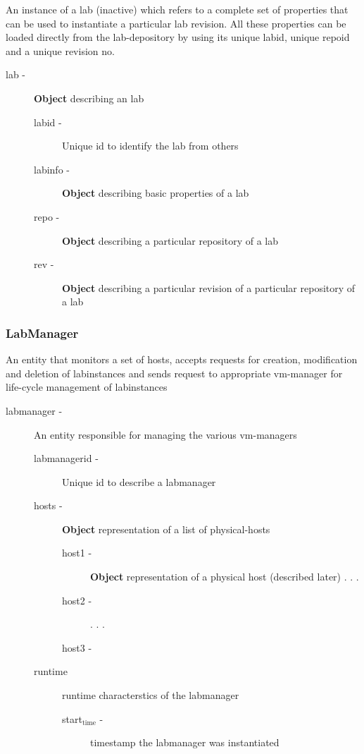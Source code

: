 \documentclass[11pt]{article}
\begin{document}
    An instance of a lab (inactive)  which refers to a complete set of
    properties that can be used to instantiate a particular lab
    revision. All these properties can be loaded directly from the
    lab-depository by using its unique labid, unique repoid and a
    unique revision no.

\begin{description}
\item [lab -]  \textbf{Object} describing an lab

\begin{description}
\item [labid -] Unique id to identify the lab from others
\item [labinfo -] \textbf{Object} describing basic properties of a lab
\item [repo -] \textbf{Object} describing a particular repository of a lab
\item [rev -] \textbf{Object} describing a particular revision of a particular
             repository of a lab
\end{description}

\end{description}
\subsubsection{LabManager}
\label{sec-1.3.3}


     An entity that monitors a set of hosts, accepts requests for
     creation, modification and deletion of labinstances and sends
     request to appropriate vm-manager for life-cycle management of
     labinstances

\begin{description}
\item [labmanager -] An entity responsible for managing the various vm-managers

\begin{description}
\item [labmanagerid -] Unique id to describe a labmanager
\item [hosts -] \textbf{Object} representation of a list of physical-hosts

\begin{description}
\item [host1 -] \textbf{Object} representation of a physical host (described later)
            .
            .
            .
\item [host2 -]
            .
            .
            .
\item [host3 -]
\end{description}

\item [runtime] runtime characterstics of the labmanager

\begin{description}
\item [start$_{\mathrm{time}}$ -] timestamp the labmanager was instantiated
\end{description}

\end{description}

\end{description}
\end{document}
